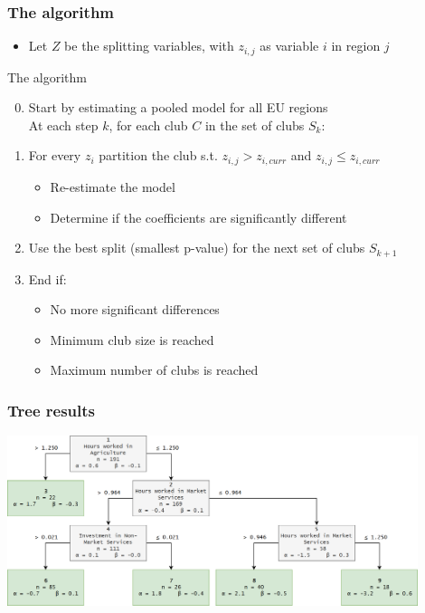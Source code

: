 \documentclass{beamer}
\begin{document}
\begin{frame}
  \frametitle{The algorithm}
  \begin{itemize}
  \item Let $Z$ be the splitting variables, with $z_{i, j}$ as variable $i$ in region $j$
  \end{itemize}
    \begin{block}{The algorithm}
      \begin{enumerate}
        \setcounter{enumi}{-1}
      \item Start by estimating a pooled model for all EU regions \\
      \vspace{1em} At each step $k$, for each club $C$ in the set of clubs $S_k$:
      \item For every $z_i$ partition the club s.t. $z_{i, j} > z_{i, curr}$ and $z_{i, j} \leq z_{i, curr}$
        \begin{itemize}
        \item Re-estimate the model
        \item Determine if the coefficients are significantly different
        \end{itemize}
      \item Use the best split (smallest p-value) for the next set of clubs $S_{k+1}$
      \item End if:
        \begin{itemize}
        \item No more significant differences
        \item Minimum club size is reached
        \item Maximum number of clubs is reached
        \end{itemize}
    \end{enumerate}
  \end{block}
\end{frame}

\begin{frame}
  \frametitle{Tree results}
  \centering
  \includegraphics[width=12cm]{tree.png}
\end{frame}
\end{document}
